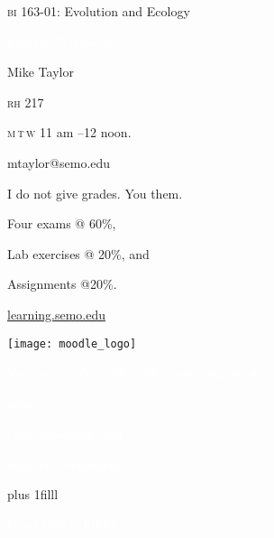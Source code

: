 \documentclass[t,handout]{beamer}  %
\newcommand{\btVFill}{\vskip0pt plus 1filll}
\begin{document}
{
\begin{frame}[b,plain]{\textcolor{orange7}{\textsc{bi} 163-01: Evolution and Ecology}}


\hfill\textcolor{white}{\tiny Fir0002, Wikimedia }
\end{frame}
}

{
\begin{frame}[t,plain]
	\large
	\vspace{5ex}
	\hangpara\hspace{17em} Mike Taylor

	\hangpara\hspace{17em} \textsc{rh} 217

	\hangpara\hspace{17em} \textsc{m}\,\textsc{t}\,\textsc{w} 11 am --12 noon.

	\hangpara\hspace{17em} mtaylor@semo.edu

\end{frame}
}


\begin{frame}[t]{I do not give grades. You  them.}

	\hangpara Four exams @ 60\%,

	\hangpara Lab exercises @ 20\%, and

	\hangpara Assignments @20\%.

\end{frame}


\begin{frame}[t]{\href{http://learning.semo.edu}{learning.semo.edu}}
	\begin{center}
		\texttt{[image: moodle\_logo]}
		
		\medskip
		
	\end{center}
	
\end{frame}



{
\begin{frame}{\textcolor{white}{You  your grades with}}
\hangpara\textcolor{white}{iscellaneous assignments,}
\pause

\hangpara\textcolor{white}{xams,}
\pause

\hangpara\textcolor{white}{nline homework, and}
\pause

\hangpara\textcolor{white}{eekly lab assignments.}

\vskip 0pt plus 1filll

\textcolor{white}{\tiny Good Bokeh, Flickr, }
\end{frame}
}
\end{document}
